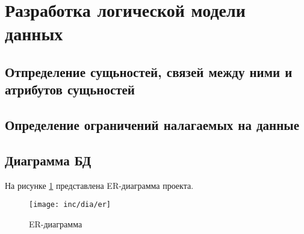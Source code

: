 \section{Разработка логической модели данных}

\subsection{Отпределение сущьностей, связей между ними и атрибутов сущьностей}

\subsection{Определение ограничений налагаемых на данные}


\subsection{Диаграмма БД}
На рисунке \ref{fig:er} представлена ER-диаграмма проекта.
\begin{landscape}
\begin{figure}
  \centering
  \texttt{[image: inc/dia/er]}
  \caption{ER-диаграмма}
  \label{fig:er}
\end{figure}
\end{landscape}
\cite{cha:analysis}





